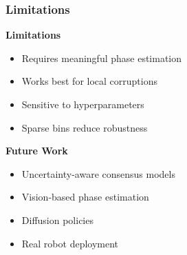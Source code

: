 \begin{frame}
    \frametitle{\textbf{Limitations}}

    \begin{block}
        {\textbf{Limitations}}

        \begin{itemize}
            \item Requires meaningful phase estimation
            \item Works best for local corruptions
            \item Sensitive to hyperparameters
            \item Sparse bins reduce robustness
        \end{itemize}
    \end{block}

    \begin{block}
        {\textbf{Future Work}}

        \begin{itemize}
            \item Uncertainty-aware consensus models
            \item Vision-based phase estimation
            \item Diffusion policies
            \item Real robot deployment
        \end{itemize}
    \end{block}
\end{frame}
